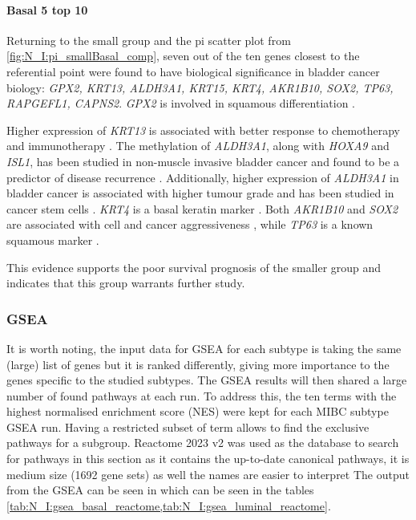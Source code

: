 \paragraph*{Basal 5 top 10}

Returning to the small group and the pi scatter plot from \cref{fig:N_I:pi_smallBasal_comp}, seven out of the ten genes closest to the referential point were found to have biological significance in bladder cancer biology: \textit{GPX2, KRT13, ALDH3A1, KRT15, KRT4, AKR1B10, SOX2, TP63, RAPGEFL1, CAPNS2}. \textit{GPX2} is involved in squamous differentiation \citet{Naiki2018-fp}. 

Higher expression of \textit{KRT13} is associated with better response to chemotherapy and immunotherapy \citep{Yu2023-db}. The methylation of \textit{ALDH3A1}, along with \textit{HOXA9} and \textit{ISL1}, has been studied in non-muscle invasive bladder cancer and found to be a predictor of disease recurrence \citep{McLean2023-qk}. Additionally, higher expression of \textit{ALDH3A1} in bladder cancer is associated with higher tumour grade and has been studied in cancer stem cells \citet{Kim2013-th}. \textit{KRT4} is a basal keratin marker \citep{Marzouka2018-ge}. Both \textit{AKR1B10} and \textit{SOX2} are associated with cell and cancer aggressiveness \citep{Huang2021-bn, Chiu2020-xh}, while \textit{TP63} is a known squamous marker \citep{Robertson2017-mg}. 

This evidence supports the poor survival prognosis of the smaller group and indicates that this group warrants further study.


\subsubsection* {GSEA}

It is worth noting, the input data for GSEA for each subtype is taking the same (large) list of genes but it is ranked differently, giving more importance to the genes specific to the studied subtypes. The GSEA results will then shared a large number of found pathways at each run. To address this, the ten terms with the highest normalised enrichment score (NES) were kept for each MIBC subtype GSEA run. Having a restricted subset of term allows to find the exclusive pathways for a subgroup. Reactome 2023 v2 was used as the database to search for pathways in this section as it contains the up-to-date canonical pathways, it is medium size (1692 gene sets) as well the names are easier to interpret The output from the GSEA can be seen in which can be seen in the tables \cref{tab:N_I:gsea_basal_reactome,tab:N_I:gsea_luminal_reactome}.

